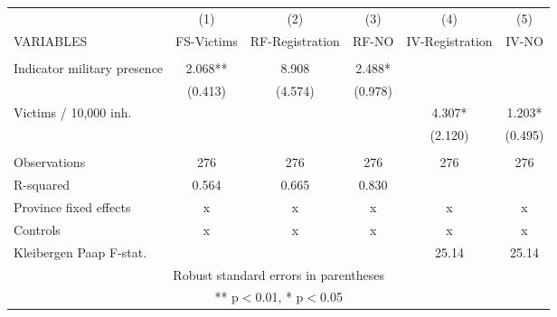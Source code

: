 \begin{tabular}{lccccc} \hline
 & (1) & (2) & (3) & (4) & (5) \\
VARIABLES & FS-Victims & RF-Registration & RF-NO & IV-Registration & IV-NO \\ \hline
 &  &  &  &  &  \\
Indicator military presence & 2.068** & 8.908 & 2.488* &  &  \\
 & (0.413) & (4.574) & (0.978) &  &  \\
Victims / 10,000 inh. &  &  &  & 4.307* & 1.203* \\
 &  &  &  & (2.120) & (0.495) \\
 &  &  &  &  &  \\
Observations & 276 & 276 & 276 & 276 & 276 \\
R-squared & 0.564 & 0.665 & 0.830 &  &  \\
Province fixed effects & x & x & x & x & x \\
Controls & x & x & x & x & x \\
 Kleibergen Paap F-stat. &  &  &  & 25.14 & 25.14 \\ \hline
\multicolumn{6}{c}{ Robust standard errors in parentheses} \\
\multicolumn{6}{c}{ ** p$<$0.01, * p$<$0.05} \\
\end{tabular}
